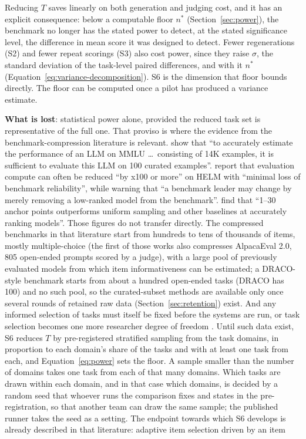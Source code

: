 \documentclass[11pt]{article}
\begin{document}
Reducing $T$ saves linearly on both generation and judging cost, and it has an explicit consequence: below a computable floor $n^*$ (Section~\ref{sec:power}), the benchmark no longer has the stated power to detect, at the stated significance level, the difference in mean score it was designed to detect. Fewer regenerations (S2) and fewer repeat scorings (S3) also cost power, since they raise $\sigma$, the standard deviation of the task-level paired differences, and with it $n^*$ (Equation~\ref{eq:variance-decomposition}). S6 is the dimension that floor bounds directly. The floor can be computed once a pilot has produced a variance estimate.

\textbf{What is lost}: statistical power alone, provided the reduced task set
is representative of the full one. That proviso is where the evidence from the
benchmark-compression literature is relevant. \citet{polo2024tinybenchmarks} show that
``to accurately estimate the performance of an LLM on MMLU \ldots\ consisting of 14K
examples, it is sufficient to evaluate this LLM on 100 curated examples''.
\citet{perlitz2024efficient} report that evaluation compute can often be reduced ``by x100 or more''
on HELM with ``minimal loss of benchmark reliability'', while warning that ``a benchmark
leader may change by merely removing a low-ranked model from the benchmark''.
\citet{vivek2024anchor} find that ``1--30 anchor points outperforms uniform sampling and
other baselines at accurately ranking models''. Those figures do not transfer directly. The compressed benchmarks in that literature start from hundreds to tens of thousands of items, mostly multiple-choice (the first of those works also compresses AlpacaEval 2.0, 805 open-ended prompts scored by a judge), with a large pool of previously evaluated models from which item
informativeness can be estimated; a DRACO-style benchmark starts from about a hundred open-ended
tasks (DRACO has 100) and no such pool, so the curated-subset methods are available only once several
rounds of retained raw data (Section~\ref{sec:retention}) exist. And any informed selection
of tasks must itself be fixed before the systems are run, or task selection becomes one
more researcher degree of freedom \citep{simmons2011falsepositive}. Until such data exist, S6 reduces
$T$ by pre-registered stratified sampling from the task domains, in proportion to each domain's share of the tasks and with at least one task from each, and Equation~\ref{eq:power}
sets the floor. A sample smaller than the number of domains takes one task from each of that many domains. Which tasks are drawn within each domain, and in that case which domains, is decided by a random seed that whoever runs the comparison fixes and states in the pre-registration, so that another team can draw the same sample; the published runner takes the seed as a setting. The endpoint towards which S6 develops is already described in that literature: adaptive item selection driven by an item
\end{document}

